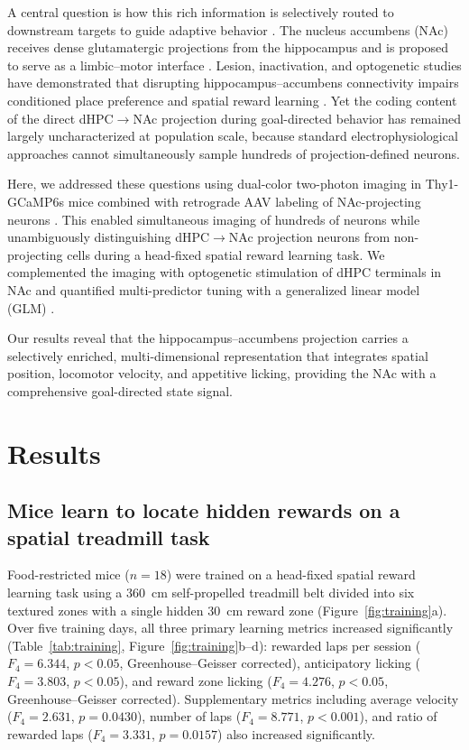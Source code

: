 \documentclass[11pt]{article}
\begin{document}
A central question is how this rich information is selectively routed to downstream targets to guide adaptive behavior \citep{ciocchi2015selective,xu2016ventral}. The nucleus accumbens (NAc) receives dense glutamatergic projections from the hippocampus and is proposed to serve as a limbic--motor interface \citep{mogenson1980motivation,floresco2015nucleus,britt2012synaptic}. Lesion, inactivation, and optogenetic studies have demonstrated that disrupting hippocampus--accumbens connectivity impairs conditioned place preference and spatial reward learning \citep{ito2008functional,legates2018distinct,trouche2019hippocampus}. Yet the coding content of the direct dHPC$\to$NAc projection during goal-directed behavior has remained largely uncharacterized at population scale, because standard electrophysiological approaches cannot simultaneously sample hundreds of projection-defined neurons.

Here, we addressed these questions using dual-color two-photon imaging in Thy1-GCaMP6s mice \citep{dana2014thy1,chen2013ultrasensitive} combined with retrograde AAV labeling of NAc-projecting neurons \citep{tervo2016designer}. This enabled simultaneous imaging of hundreds of neurons while unambiguously distinguishing dHPC$\to$NAc projection neurons from non-projecting cells during a head-fixed spatial reward learning task. We complemented the imaging with optogenetic stimulation of dHPC terminals in NAc and quantified multi-predictor tuning with a generalized linear model (GLM) \citep{hardcastle2017multiplexed}.

Our results reveal that the hippocampus--accumbens projection carries a selectively enriched, multi-dimensional representation that integrates spatial position, locomotor velocity, and appetitive licking, providing the NAc with a comprehensive goal-directed state signal.

\section{Results}

\subsection{Mice learn to locate hidden rewards on a spatial treadmill task}

Food-restricted mice ($n=18$) were trained on a head-fixed spatial reward learning task using a $360$~cm self-propelled treadmill belt divided into six textured zones with a single hidden $30$~cm reward zone (Figure~\ref{fig:training}a). Over five training days, all three primary learning metrics increased significantly (Table~\ref{tab:training}, Figure~\ref{fig:training}b--d): rewarded laps per session ($F_{4}=6.344$, $p<0.05$, Greenhouse--Geisser corrected), anticipatory licking ($F_{4}=3.803$, $p<0.05$), and reward zone licking ($F_{4}=4.276$, $p<0.05$, Greenhouse--Geisser corrected). Supplementary metrics including average velocity ($F_{4}=2.631$, $p=0.0430$), number of laps ($F_{4}=8.771$, $p<0.001$), and ratio of rewarded laps ($F_{4}=3.331$, $p=0.0157$) also increased significantly.
\end{document}
